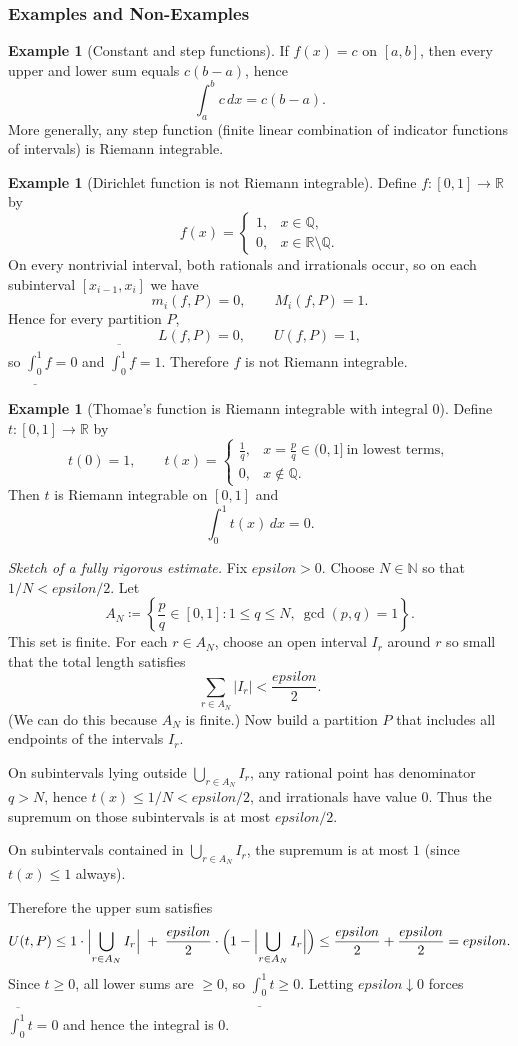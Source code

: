 \documentclass[12pt]{article}
\numberwithin{equation}{section}
\def\eps{epsilon}
\def\diff{d}
\newcommand{\RR}{\mathbb{R}}
\newcommand{\QQ}{\mathbb{Q}}
\newcommand{\NN}{\mathbb{N}}
\newcommand{\eps}{\varepsilon}               %
\newcommand{\diff}{\mathop{}\!\mathrm{d}}    %
\newcommand{\casesm}[1]{\begin{cases}#1\end{cases}}
\theoremstyle{plain}
\theoremstyle{definition}
\newtheorem{example}[theorem]{Example}
\theoremstyle{remark}
\begin{document}
\subsubsection{Examples and Non-Examples}

\begin{example}[Constant and step functions]
If $f(x)=c$ on $[a,b]$, then every upper and lower sum equals $c(b-a)$, hence
\[
\int_a^b c\,\diff x = c(b-a).
\]
More generally, any step function (finite linear combination of indicator functions of intervals) is Riemann integrable.
\end{example}

\begin{example}[Dirichlet function is not Riemann integrable]\label{ex:dirichlet}
Define $f:[0,1]\to\RR$ by
\[
f(x)=
\casesm{
1, & x\in\QQ,\\
0, & x\in\RR\setminus\QQ.
}
\]
On every nontrivial interval, both rationals and irrationals occur, so on each subinterval $[x_{i-1},x_i]$ we have
\[
m_i(f,P)=0,\qquad M_i(f,P)=1.
\]
Hence for every partition $P$,
\[
L(f,P)=0,\qquad U(f,P)=1,
\]
so $\underline{\int_0^1} f=0$ and $\overline{\int_0^1} f=1$. Therefore $f$ is not Riemann integrable.
\end{example}

\begin{example}[Thomae's function is Riemann integrable with integral $0$]\label{ex:thomae}
Define $t:[0,1]\to\RR$ by
\[
t(0)=1,\qquad
t(x)=
\casesm{
\frac{1}{q}, & x=\frac{p}{q}\in(0,1]\ \text{in lowest terms},\\
0, & x\notin\QQ.
}
\]
Then $t$ is Riemann integrable on $[0,1]$ and
\[
\int_0^1 t(x)\,\diff x = 0.
\]

\smallskip
\noindent\emph{Sketch of a fully rigorous estimate.}
Fix $\eps>0$.
Choose $N\in\NN$ so that $1/N<\eps/2$.
Let
\[
A_N\coloneqq \left\{\frac{p}{q}\in[0,1]: 1\le q\le N,\ \gcd(p,q)=1\right\}.
\]
This set is finite. For each $r\in A_N$, choose an open interval $I_r$ around $r$ so small that the total length satisfies
\[
\sum_{r\in A_N} |I_r| < \frac{\eps}{2}.
\]
(We can do this because $A_N$ is finite.)
Now build a partition $P$ that includes all endpoints of the intervals $I_r$.

On subintervals lying outside $\bigcup_{r\in A_N} I_r$, any rational point has denominator $q>N$, hence $t(x)\le 1/N<\eps/2$,
and irrationals have value $0$.
Thus the supremum on those subintervals is at most $\eps/2$.

On subintervals contained in $\bigcup_{r\in A_N} I_r$, the supremum is at most $1$ (since $t(x)\le 1$ always).

Therefore the upper sum satisfies
\[
U(t,P)
\le
1\cdot \Bigl|\bigcup_{r\in A_N} I_r\Bigr|
\;+\;
\frac{\eps}{2}\cdot \Bigl(1-\Bigl|\bigcup_{r\in A_N} I_r\Bigr|\Bigr)
\le
\frac{\eps}{2}+\frac{\eps}{2}=\eps.
\]
Since $t\ge 0$, all lower sums are $\ge 0$, so $\underline{\int_0^1} t\ge 0$.
Letting $\eps\downarrow 0$ forces $\overline{\int_0^1} t=0$ and hence the integral is $0$.
\end{example}
\end{document}
